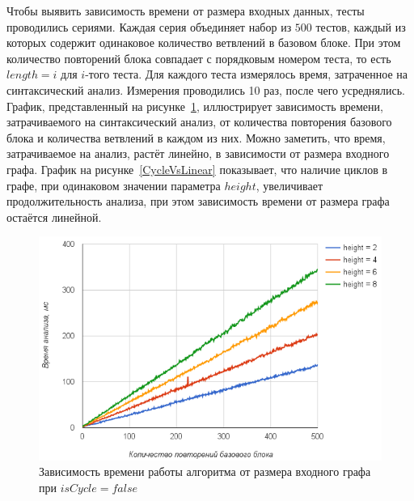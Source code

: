 Чтобы выявить зависимость времени от размера входных данных, тесты проводились сериями. Каждая серия объединяет набор из $500$ тестов, каждый из которых содержит одинаковое количество ветвлений в базовом блоке. При этом количество повторений блока совпадает с порядковым номером теста, то есть $length=i$ для $i$-того теста. Для каждого теста измерялось время, затраченное на синтаксический анализ. Измерения проводились 10 раз, после чего усреднялись. График, представленный на рисунке~\ref{diffheights}, иллюстрирует зависимость времени, затрачиваемого на синтаксический анализ, от количества повторения базового блока и количества ветвлений в каждом из них. Можно заметить, что время, затрачиваемое на анализ, растёт линейно, в зависимости от размера входного графа. График на рисунке~\ref{CycleVsLinear} показывает, что наличие циклов в графе, при одинаковом значении параметра $height$, увеличивает продолжительность анализа, при этом зависимость времени от размера графа остаётся линейной.

\begin{figure}[h!]
 \centering
 \includegraphics[width=15cm]{pics/diffheights.png}
 \caption{Зависимость времени работы алгоритма от размера входного графа при $isCycle=false$}
 \label{diffheights}
\end{figure}

